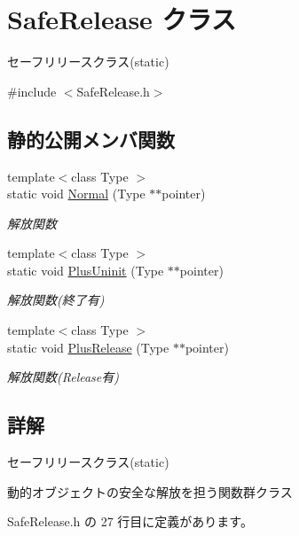 \hypertarget{class_safe_release}{}\section{Safe\+Release クラス}
\label{class_safe_release}


セーフリリースクラス(static)  




{\ttfamily \#include $<$Safe\+Release.\+h$>$}

\subsection*{静的公開メンバ関数}
\begin{DoxyCompactItemize}
\item 
{\footnotesize template$<$class Type $>$ }\\static void \mbox{\hyperlink{class_safe_release_a6ecab682df939c28d8867a67c2f4b51f}{Normal}} (Type $\ast$$\ast$pointer)
\begin{DoxyCompactList}\small\item\em 解放関数 \end{DoxyCompactList}\item 
{\footnotesize template$<$class Type $>$ }\\static void \mbox{\hyperlink{class_safe_release_a06160f5466a88f021e6f28489de9df1e}{Plus\+Uninit}} (Type $\ast$$\ast$pointer)
\begin{DoxyCompactList}\small\item\em 解放関数(終了有) \end{DoxyCompactList}\item 
{\footnotesize template$<$class Type $>$ }\\static void \mbox{\hyperlink{class_safe_release_a507950335a85da67c1722cce83dca9ae}{Plus\+Release}} (Type $\ast$$\ast$pointer)
\begin{DoxyCompactList}\small\item\em 解放関数(Release有) \end{DoxyCompactList}\end{DoxyCompactItemize}


\subsection{詳解}
セーフリリースクラス(static) 

動的オブジェクトの安全な解放を担う関数群クラス 

 Safe\+Release.\+h の 27 行目に定義があります。




